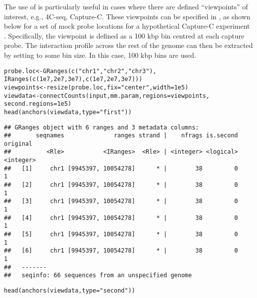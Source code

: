 \documentclass{report}\usepackage[]{graphicx}\usepackage[usenames,dvipsnames]{color}
\newcommand{\hlnum}[1]{\textcolor[rgb]{0.816,0.125,0.439}{#1}}%
\newcommand{\hlstr}[1]{\textcolor[rgb]{0.251,0.627,0.251}{#1}}%
\newcommand{\hlstd}[1]{\textcolor[rgb]{0.251,0.251,0.251}{#1}}%
\newcommand{\hlkwb}[1]{\textcolor[rgb]{0,0,0}{#1}}%
\newcommand{\hlkwc}[1]{\textcolor[rgb]{0.251,0.251,0.251}{#1}}%
\newcommand{\hlkwd}[1]{\textcolor[rgb]{0.878,0.439,0.125}{#1}}%
\newenvironment{knitrout}{}{} %
\begin{document}
The use of  is particularly useful in cases where there are defined ``viewpoints'' of interest, e.g., 4C-seq, Capture-C.
These viewpoints can be specified in , as shown below for a set of mock probe locations for a hypothetical Capture-C experiment \cite{hughes2014analysis}.
Specifically, the viewpoint is defined as a 100 kbp bin centred at each capture probe.
The interaction profile across the rest of the genome can then be extracted by setting  to some bin size.
In this case, 100 kbp bins are used.

\begin{knitrout}
\color{fgcolor}\begin{kframe}
\begin{alltt}
\hlstd{probe.loc} \hlkwb{<-} \hlkwd{GRanges}\hlstd{(}\hlkwd{c}\hlstd{(}\hlstr{"chr1"}\hlstd{,} \hlstr{"chr2"}\hlstd{,} \hlstr{"chr3"}\hlstd{),}
    \hlkwd{IRanges}\hlstd{(}\hlkwd{c}\hlstd{(}\hlnum{1e7}\hlstd{,} \hlnum{2e7}\hlstd{,} \hlnum{3e7}\hlstd{),} \hlkwd{c}\hlstd{(}\hlnum{1e7}\hlstd{,} \hlnum{2e7}\hlstd{,} \hlnum{3e7}\hlstd{)))}
\hlstd{viewpoints} \hlkwb{<-} \hlkwd{resize}\hlstd{(probe.loc,} \hlkwc{fix}\hlstd{=}\hlstr{"center"}\hlstd{,} \hlkwc{width}\hlstd{=}\hlnum{1e5}\hlstd{)}
\hlstd{viewdata} \hlkwb{<-} \hlkwd{connectCounts}\hlstd{(input, mm.param,} \hlkwc{regions}\hlstd{=viewpoints,}
                          \hlkwc{second.regions}\hlstd{=}\hlnum{1e5}\hlstd{)}
\hlkwd{head}\hlstd{(}\hlkwd{anchors}\hlstd{(viewdata,} \hlkwc{type}\hlstd{=}\hlstr{"first"}\hlstd{))}
\end{alltt}
\begin{verbatim}
## GRanges object with 6 ranges and 3 metadata columns:
##       seqnames              ranges strand |    nfrags is.second  original
##          <Rle>           <IRanges>  <Rle> | <integer> <logical> <integer>
##   [1]     chr1 [9945397, 10054278]      * |        38         0         1
##   [2]     chr1 [9945397, 10054278]      * |        38         0         1
##   [3]     chr1 [9945397, 10054278]      * |        38         0         1
##   [4]     chr1 [9945397, 10054278]      * |        38         0         1
##   [5]     chr1 [9945397, 10054278]      * |        38         0         1
##   [6]     chr1 [9945397, 10054278]      * |        38         0         1
##   -------
##   seqinfo: 66 sequences from an unspecified genome
\end{verbatim}
\begin{alltt}
\hlkwd{head}\hlstd{(}\hlkwd{anchors}\hlstd{(viewdata,} \hlkwc{type}\hlstd{=}\hlstr{"second"}\hlstd{))}

\end{alltt}
\end{kframe}
\end{knitrout}
\end{document}
